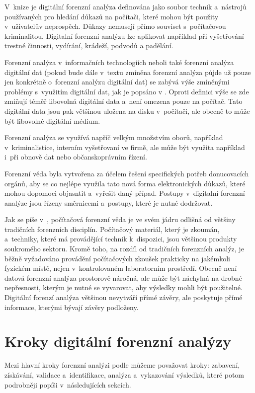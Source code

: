 \documentclass[thesis=B,czech]{FITthesis}[2012/06/26]
\begin{document}
V~knize \cite{RECHAndBook} je digitální forenzní analýza definována jako soubor technik a~nástrojů používaných pro hledání důkazů na počítači, které mohou být použity v~uživatelův neprospěch. Důkazy nemusejí přímo souviset s~počítačovou kriminalitou. Digitalní forenzní analýzu lze aplikovat například při vyšetřování trestné činnosti, vydírání, krádeží, podvodů a padělání.

Forenzní analýza v~informačních technologiích neboli také forenzní analýza digitální dat (pokud bude dále v~textu zmíněna forenzní analýza půjde už pouze jen konkrétně o~forenzní analýzu digitální dat) se zabývá výše zmíněnými problémy s~využitím digitální dat, jak je popsáno v \cite{for_root}. Oproti definici výše se zde zmiňují téměř libovolná digitální data a~není omezena pouze na počítač. Tato digitální data jsou pak většinou uložena na disku v~počítači, ale obecně to může být libovolné digitální médium.

Forenzní analýza se využívá napříč velkým množstvím oborů, například v~kriminalistice, interním vyšetřovaní ve firmě, ale může být využita například i~při obnově dat nebo občanskoprávním řízení.

Forenzní věda byla vytvořena za účelem řešení specifických potřeb donucovacích orgánů, aby se co nejlépe využila tato nová forma elektronických důkazů, které mohou dopomoci objasntit a~vyřešit daný případ. Postupy v~digitalní forenzní analýze jsou řízeny směrnicemi a~postupy, které je nutné dodržovat.

Jak se píše v~\cite{for_uvod}, počítačová forenzní věda je ve svém jádru odlišná od většiny tradičních forenzních disciplín. Počítačový materiál, který je zkoumán, a~techniky, které má provádějící technik k~dispozici, jsou většinou produkty soukromého sektoru. Kromě toho, na rozdíl od tradičních forenzních analýz, je běžně vyžadováno provádění počítačových zkoušek prakticky na jakémkoli fyzickém místě, nejen v~kontrolovaném laboratorním prostředí. Obecně není datová forenzní analýza prostorově náročná, ale může být náchylná na drobné nepřesnosti, kterým je nutné se vyvarovat, aby výsledky mohli být použitelné. Digitální forenzí analýza většinou nevytváří přímé závěry, ale poskytuje přímé informace, kterými bývají závěry podloženy.


\section{Kroky digitální forenzní analýzy}
Mezi hlavní kroky forenzní analýzi podle \cite{carroll2008computer} můžeme považovat kroky: zabavení, získávání, validace a~identifikace, analýza a~vykazování výsledků, které potom podrobněji popíši v~následujících sekcích.
\end{document}
